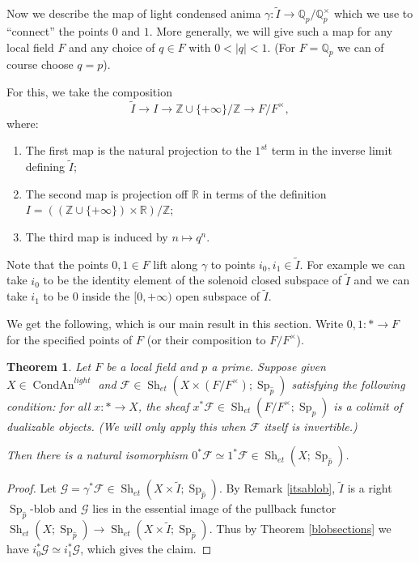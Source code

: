 \documentclass[12pt]{article}
\newtheorem{theorem}{Theorem}[section]
\newcommand{\on}{\operatorname}
\newcommand{\mc}{\mathcal}
\newcommand{\wh}{\widehat}
\begin{document}
Now we describe the map of light condensed anima $\gamma:\widetilde{I}\rightarrow\mathbb{Q}_p/\mathbb{Q}_p^\times$ which we use to ``connect'' the points $0$ and $1$.  More generally, we will give such a map for any local field $F$ and any choice of $q\in F$ with $0<|q|<1$.  (For $F=\mathbb{Q}_p$ we can of course choose $q=p$).

For this, we take the composition
$$\widetilde{I}\to I \to \mathbb{Z}\cup\{+\infty\}/\mathbb{Z} \to F/F^\times,$$
where:
\begin{enumerate}
\item The first map is the natural projection to the $1^{st}$ term in the inverse limit defining $\widetilde{I}$;
\item The second map is projection off $\mathbb{R}$ in terms of the definition $I=((\mathbb{Z}\cup\{+\infty\})\times \mathbb{R})/\mathbb{Z}$;
\item The third map is induced by $n\mapsto q^n$.
\end{enumerate}

Note that the points $0,1\in F$ lift along $\gamma$ to points $i_0,i_1\in \widetilde{I}$.  For example we can take $i_0$ to be the identity element of the solenoid closed subspace of $\widetilde{I}$ and we can take $i_1$ to be $0$ inside the $[0,+\infty)$ open subspace of $\widetilde{I}$.

We get the following, which is our main result in this section. Write $0,1:\ast \to F$ for the specified points of $F$ (or their composition to $F/F^\times$).

\begin{theorem}\label{deformiso}
Let $F$ be a local field and $p$ a prime.  Suppose given $X\in\on{CondAn}^{light}$ and $\mathcal{F}\in\on{Sh}_{et}(X\times(F/F^\times);\on{Sp}_{\wh{p}})$ satisfying the following condition: for all $x:\ast\rightarrow X$, the sheaf $x^\ast\mathcal{F}\in\on{Sh}_{et}(F/F^\times;\on{Sp}_{\wh{p}})$ is a colimit of dualizable objects.  (We will only apply this when $\mc{F}$ itself is invertible.)

Then there is a natural isomorphism $0^\ast\mathcal{F}\simeq 1^\ast\mathcal{F} \in \on{Sh}_{et}(X;\on{Sp}_{\widehat{p}})$.
\end{theorem}
\begin{proof}
Let $\mathcal{G} = \gamma^\ast \mathcal{F} \in \on{Sh}_{et}(X\times \widetilde{I};\on{Sp}_{\wh{p}})$.  By Remark \ref{itsablob}, $\widetilde{I}$ is a right $\on{Sp}_{\wh{p}}$-blob and $\mathcal{G}$ lies in the essential image of the pullback functor $\on{Sh}_{et}(X;\on{Sp}_{\wh{p}})\to\on{Sh}_{et}(X\times \widetilde{I};\on{Sp}_{\wh{p}})$.  Thus by Theorem \ref{blobsections} we have $i_0^\ast\mathcal{G}\simeq i_1^\ast\mathcal{G}$, which gives the claim.
\end{proof}
\end{document}
